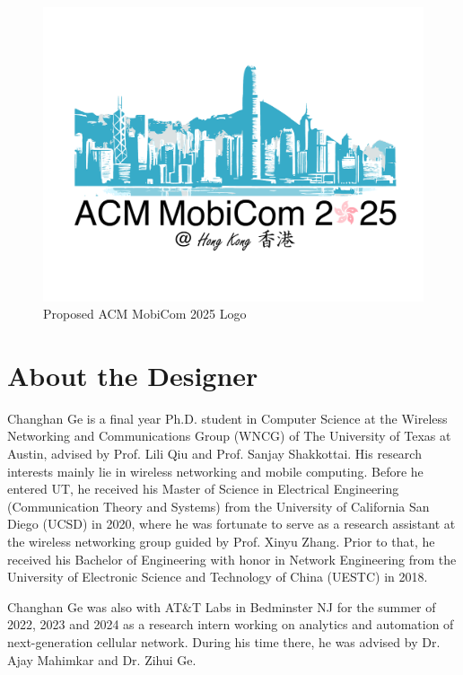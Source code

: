 \documentclass[sigconf, 10pt]{acmart}
\begin{document}
\begin{figure}[h]
	
	\centering
	\includegraphics[width=\columnwidth, clip=true, trim=2cm 3cm 2cm 4cm]{../logo/mobicom25_logo.pdf}
	\caption{Proposed ACM MobiCom 2025 Logo}
	\label{fig:logo}
\end{figure}

\section {About the Designer}
Changhan Ge is a final year Ph.D. student in Computer Science at the Wireless Networking and Communications Group (WNCG) of The University of Texas at Austin, advised by Prof. Lili Qiu and Prof. Sanjay Shakkottai. His research interests mainly lie in wireless networking and mobile computing. Before he entered UT, he received his Master of Science in Electrical Engineering (Communication Theory and Systems) from the University of California San Diego (UCSD) in 2020, where he was fortunate to serve as a research assistant at the wireless networking group guided by Prof. Xinyu Zhang. Prior to that, he received his Bachelor of Engineering with honor in Network Engineering from the University of Electronic Science and Technology of China (UESTC) in 2018. 

Changhan Ge was also with AT\&T Labs in Bedminster NJ for the summer of 2022, 2023 and 2024 as a research intern working on analytics and automation of next-generation cellular network. During his time there, he was advised by Dr. Ajay Mahimkar and Dr. Zihui Ge.
\end{document}
